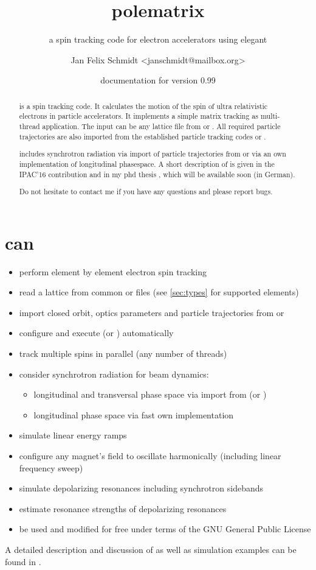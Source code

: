 \documentclass[a4paper]{scrartcl}
\author{Jan Felix Schmidt \textless janschmidt@mailbox.org\textgreater}
\title{polematrix}
\subtitle{a spin tracking code for electron accelerators using elegant}
\date{documentation for version 0.99}
\begin{document}
\maketitle

\begin{abstract}
  \polem is a spin tracking code. It calculates the motion of the spin of ultra
  relativistic electrons in particle accelerators. It implements a simple matrix tracking
  as multi-thread \cpp application. The input can be any lattice file from \ele or
  \madx. All required particle trajectories are also imported from the established
  particle tracking codes \ele or \madx.

  \polem includes synchrotron radiation via import of particle trajectories from \ele or
  via an own implementation of longitudinal phasespace. A short description of \polem is
  given in the IPAC'16 contribution \cite{IPAC16-decoh} and in my phd thesis \cite{dr},
  which will be available soon (in German).
  
  Do not hesitate to contact me if you have any questions and please report bugs.
\end{abstract}

\tableofcontents
\clearpage


\section{\polem can}
\label{sec:polem-can}

\begin{itemize}
\item perform element by element electron spin tracking
\item read a lattice from common \ele or \madx files (see \cref{sec:types} for supported elements)
\item import closed orbit, optics parameters and particle trajectories from \ele or
  \madx
\item configure and execute \ele (or \madx) automatically
\item track multiple spins in parallel (any number of threads)

\item consider synchrotron radiation for beam dynamics:
  \begin{itemize}
  \item longitudinal and transversal phase space via import from \ele (or \madx)
  \item longitudinal phase space via fast own implementation
  \end{itemize}
\item simulate linear energy ramps
\item configure any magnet's field to oscillate harmonically (including linear frequency sweep)
\item simulate depolarizing resonances including synchrotron sidebands
\item estimate resonance strengths of depolarizing resonances
\item be used and modified for free under terms of the GNU General Public License
\end{itemize}
A detailed description and discussion of \polem as well as simulation examples can be
found in \cite{dr}.
\end{document}
